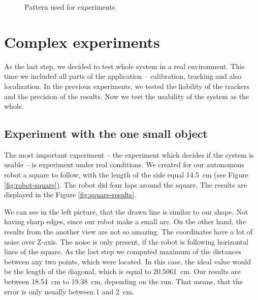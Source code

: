 \begin{figure}
\centering
{}
\caption{Pattern used for experiments}
\label{fig:grid}
\end{figure}

\section{Complex experiments}

As the last step, we decided to test whole system in a real environment. This
time we included all parts of the application -- calibration, tracking and also
localization. In the previous experiments, we tested the liability of the
trackers and the precision of the results. Now we test the usability of the
system as the whole.

\subsection{Experiment with the one small object}

The most important experiment -- the experiment which decides if the system is
usable -- is experiment under real conditions. We created for our autonomous
robot a square to follow, with the length of the side equal 14.5~cm (see Figure
\ref{fig:robot-square}). The robot did four laps around the square. The
results are displayed in the Figure \ref{fig:square-results}.

We can see in the left picture, that the drawn line is similar to our shape.
Not having sharp edges, since our robot make a small arc. On the other hand,
the results from the another view are not so amazing. The coordinates have a
lot of noise over Z-axis. The noise is only present, if the robot is following
horizontal lines of the square. As the last step we computed maximum of the
distances between any two points, which were located. In this case, the ideal
value would be the length of the diagonal, which is equal to 20.5061~cm. Our
results are between 18.54~cm to 19.38~cm, depending on the run. That means,
that the error is only usually between 1 and 2~cm.

